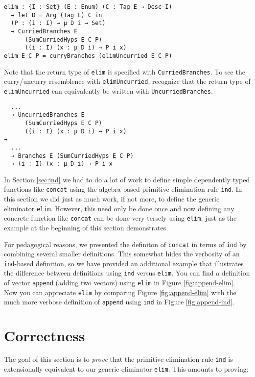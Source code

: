 \documentclass[nonatbib]{sigplanconf}
\newcommand{\reffig}[1]{Figure \ref{fig:#1}}
\newcommand{\refsec}[1]{Section \ref{sec:#1}}
\begin{document}
\begin{verbatim}
elim : {I : Set} (E : Enum) (C : Tag E → Desc I)
  → let D = Arg (Tag E) C in
  (P : (i : I) → μ D i → Set)
  → CurriedBranches E
      (SumCurriedHyps E C P)
      ((i : I) (x : μ D i) → P i x)
elim E C P = curryBranches (elimUncurried E C P)
\end{verbatim}

Note that the return type of {\tt elim} is specified with
\linebreak
{\tt CurriedBranches}. To see the curry/uncurry resemblence with
{\tt elimUncurried}, recognize that the return type of
{\tt elimUncurried} can equivalently be written with
{\tt UncurriedBranches}.

\begin{verbatim}
  ...
  → UncurriedBranches E
      (SumCurriedHyps E C P)
      ((i : I) (x : μ D i) → P i x)
⇝
  ...
  → Branches E (SumCurriedHyps E C P)
  → (i : I) (x : μ D i) → P i x
\end{verbatim}

In \refsec{ind} we had to do a lot of work to define simple dependently
typed functions like {\tt concat} using the algebra-based primitive
elimination rule {\tt ind}. In this section we did just as much work,
if not more, to define the generic eliminator {\tt elim}. However,
this need only be done once and now defining any concrete function
like {\tt concat} can be done very tersely using {\tt elim}, just as
the example at the beginning of this section demonstrates.

For pedagogical reasons, we presented the definiton of {\tt concat} in
terms of {\tt ind} by combining several smaller definitions. This
somewhat hides the verbosity of an {\tt ind}-based definition, so we
have provided an additional example that illustrates the difference
between definitions using {\tt ind} versus {\tt elim}. You can
find a definition of vector {\tt append} (adding two vectors) using
{\tt elim} in \reffig{append-elim}. Now you can appreciate {\tt elim}
by comparing \reffig{append-elim} with the
much more verbose definition of
{\tt append} using {\tt ind} in \reffig{append-ind}.

\section{Correctness}
\label{sec:correctness}

The goal of this section is to {\it prove} that the primitive
elimination rule {\tt ind} is extensionally equivalent to our
generic eliminator {\tt elim}. This amounts to proving:
\end{document}

